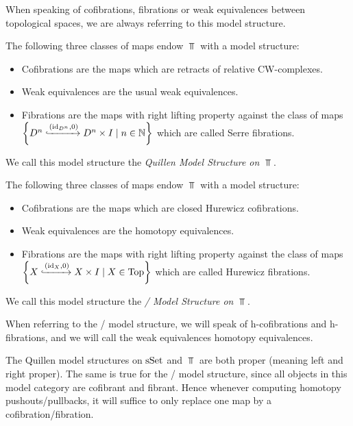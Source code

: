 When speaking of cofibrations, fibrations or weak equivalences between topological spaces, we are always referring to this model structure.
\begin{prop}
    The following three classes of maps endow $\Top$ with a model structure:
    \begin{itemize}
        \item Cofibrations are the maps which are retracts of relative CW-complexes. %
        \item Weak equivalences are the usual weak equivalences. %
        \item Fibrations are the maps with right lifting property against the class of maps $\left\lbrace D^n\xhookrightarrow{\left(\text{id}_{D^n},0\right)}D^n\times I\mid n\in\mathbb{N}\right\rbrace$ which are called Serre fibrations.
    \end{itemize}
    We call this model structure the \emph{Quillen Model Structure on $\Top$}.
\end{prop}
\begin{prop}
    The following three classes of maps endow $\Top$ with a model structure:
    \begin{itemize}
        \item Cofibrations are the maps which are closed Hurewicz cofibrations. %
        \item Weak equivalences are the homotopy equivalences.
        \item Fibrations are the maps with right lifting property against the class of maps $\left\lbrace X\xhookrightarrow{\left(\text{id}_{X},0\right)}X\times I\mid X\in\operatorname{Top}\right\rbrace$ which are called Hurewicz fibrations.
    \end{itemize}
    We call this model structure the \emph{\Strom/ Model Structure on $\Top$}.
\end{prop}
When referring to the \Strom/ model structure, we will speak of h-cofibrations and h-fibrations, and we will call the weak equivalences homotopy equivalences.
\begin{remark}[Properness]
    The Quillen model structures on $\operatorname{sSet}$ and $\Top$ are both proper (meaning left and right proper).
    The same is true for the \Strom/ model structure, since all objects in this model category are cofibrant and fibrant.
    Hence whenever computing homotopy pushouts/pullbacks, it will suffice to only replace one map by a cofibration/fibration.
\end{remark}
